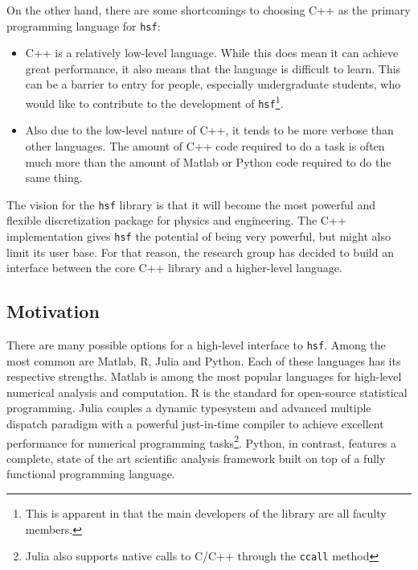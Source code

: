     On the other hand, there are some shortcomings to choosing C++ as the primary programming language for \texttt{hsf}:

    \begin{itemize}
      \item  C++ is a relatively low-level language. While this does mean it can achieve great performance, it also means that the language is difficult to learn. This can be a barrier to entry for people, especially undergraduate students, who would like to contribute to the development of \texttt{hsf}\footnote{This is apparent in that the main developers of the library are all faculty members.}.
      \item Also due to the low-level nature of C++, it tends to be more verbose than other languages. The amount of C++ code required to do a task is often much more than the amount of Matlab or Python code required to do the same thing.
    \end{itemize}
    \mainstretch{}

    The vision for the \texttt{hsf} library is that it will become the most powerful and flexible discretization package for physics and engineering. The C++ implementation gives \texttt{hsf} the potential of being very powerful, but might also limit its user base. For that reason, the research group has decided to build an interface between the core C++ library and a higher-level language.

  \subsection{Motivation} \label{ssec:motivation}

    There are many possible options for a high-level interface to \texttt{hsf}. Among the most common are Matlab, R, Julia and Python. Each of these languages has its respective strengths. Matlab is among the most popular languages for high-level numerical analysis and computation. R is the standard for open-source statistical programming. Julia couples a dynamic typesystem and advanced multiple dispatch paradigm with a powerful just-in-time compiler to achieve excellent performance for numerical programming tasks\footnote{Julia also supports native calls to C/C++ through the \texttt{ccall} method}. Python, in contrast, features a complete, state of the art scientific analysis framework built on top of a fully functional programming language.

